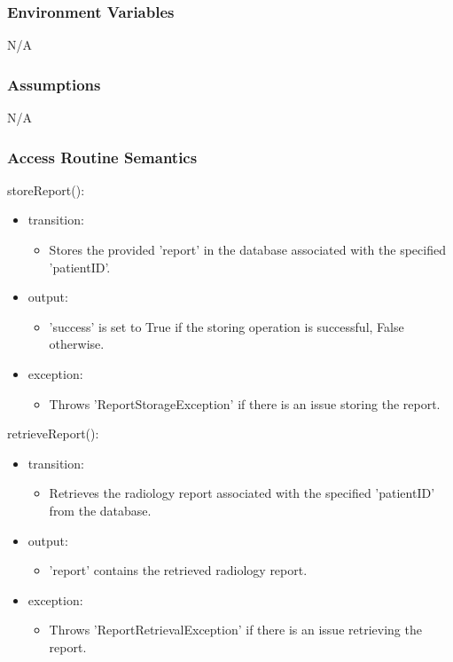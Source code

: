 \documentclass[12pt, titlepage]{article}
\begin{document}
\subsubsection{Environment Variables}
N/A
\subsubsection{Assumptions}
N/A
\subsubsection{Access Routine Semantics}

\noindent storeReport():
\begin{itemize}
\item transition: \begin{itemize}
    \item Stores the provided 'report' in the database associated with the specified 'patientID'.
\end{itemize}
\item output: \begin{itemize}
    \item 'success' is set to True if the storing operation is successful, False otherwise.
\end{itemize}
\item exception: \begin{itemize}
    \item Throws 'ReportStorageException' if there is an issue storing the report.
\end{itemize}
\end{itemize}

\noindent retrieveReport():
\begin{itemize}
\item transition: \begin{itemize}
    \item Retrieves the radiology report associated with the specified 'patientID' from the database.
\end{itemize} 
\item output: \begin{itemize}
    \item 'report' contains the retrieved radiology report.
\end{itemize}
\item exception: \begin{itemize}
    \item Throws 'ReportRetrievalException' if there is an issue retrieving the report.
\end{itemize}
\end{itemize}
\end{document}

